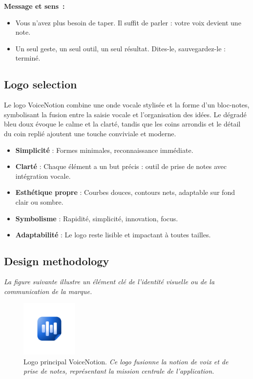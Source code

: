 \textbf{Message et sens~:}
\begin{itemize}
    \item Vous n’avez plus besoin de taper. Il suffit de parler : votre voix devient une note.
    \item Un seul geste, un seul outil, un seul résultat. Dites-le, sauvegardez-le : terminé.
\end{itemize}

\subsection{Logo selection}
Le logo VoiceNotion combine une onde vocale stylisée et la forme d’un bloc-notes, symbolisant la fusion entre la saisie vocale et l’organisation des idées. Le dégradé bleu doux évoque le calme et la clarté, tandis que les coins arrondis et le détail du coin replié ajoutent une touche conviviale et moderne.

\begin{itemize}
    \item \textbf{Simplicité} : Formes minimales, reconnaissance immédiate.
    \item \textbf{Clarté} : Chaque élément a un but précis : outil de prise de notes avec intégration vocale.
    \item \textbf{Esthétique propre} : Courbes douces, contours nets, adaptable sur fond clair ou sombre.
    \item \textbf{Symbolisme} : Rapidité, simplicité, innovation, focus.
    \item \textbf{Adaptabilité} : Le logo reste lisible et impactant à toutes tailles.
\end{itemize}

\subsection{Design methodology}
\noindent
\textit{La figure suivante illustre un élément clé de l'identité visuelle ou de la communication de la marque.}
\begin{figure}[H]
    \centering
    \includegraphics[width=0.25\textwidth]{docs/visual-indentity/pictures/logo.png}
    \caption{Logo principal VoiceNotion. \newline\textit{Ce logo fusionne la notion de voix et de prise de notes, représentant la mission centrale de l'application.}}
\end{figure}

